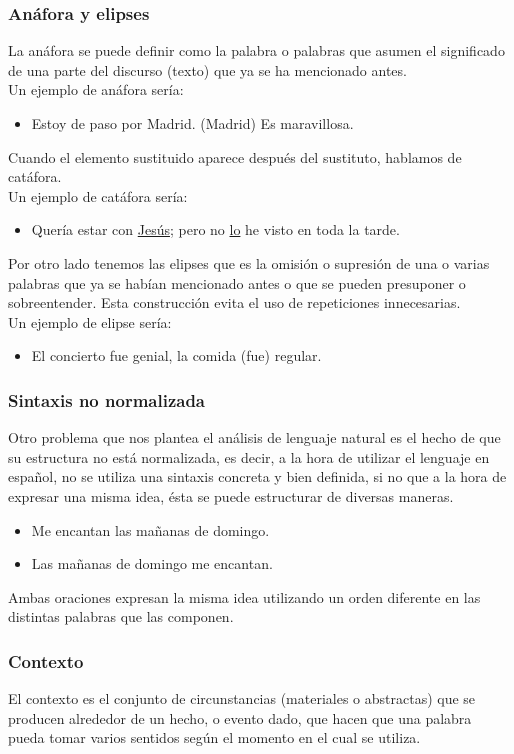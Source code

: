 \documentclass[../all.tex]{subfiles}
\begin{document}
\subsubsection{Anáfora y elipses}
	La anáfora se puede definir como la palabra o palabras que asumen el significado de una parte del discurso (texto) que ya se ha mencionado antes.\\
	Un ejemplo de anáfora sería:
	\begin{itemize}[resume]
		\item Estoy de paso por Madrid. {\small(Madrid)} Es maravillosa. 
	\end{itemize}
	Cuando el elemento sustituido aparece después del sustituto, hablamos de catáfora.\\
	Un ejemplo de catáfora sería:
	\begin{itemize}[resume]
		\item Quería estar con \underline{Jesús}; pero no \underline{lo} he visto en toda la tarde. 
	\end{itemize}

	Por otro lado tenemos las elipses que es la omisión o supresión de una o varias palabras que ya se habían mencionado antes o que se pueden presuponer o sobreentender. Esta construcción evita el uso de repeticiones innecesarias.\\
	Un ejemplo de elipse sería:
	\begin{itemize}[resume]
		\item El concierto fue genial, la comida {\small(fue)} regular. 
	\end{itemize}
\subsubsection{Sintaxis no normalizada}
	 Otro problema que nos plantea el análisis de lenguaje natural es el hecho de que su estructura no está normalizada, es decir, a la hora de utilizar el lenguaje en español, no se utiliza una sintaxis concreta y bien definida, si no que a la hora de expresar una misma idea, ésta se puede estructurar de diversas maneras.
 	\begin{itemize}[resume]
	 	\item Me encantan las mañanas de domingo.
	 	\item Las mañanas de domingo me encantan.
 	\end{itemize}
	 Ambas oraciones expresan la misma idea utilizando un orden diferente en las distintas palabras que las componen.
\subsubsection{Contexto}
	El contexto es el conjunto de circunstancias (materiales o abstractas) que se producen alrededor de un hecho, o evento dado, que hacen que una palabra pueda tomar varios sentidos según el momento en el cual se utiliza.\\
	
\end{document}
